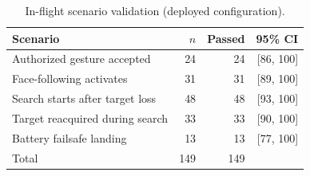 \begin{table}[t]
\caption{In-flight scenario validation (deployed configuration).}
\label{tab:flight}
\centering
\begin{tabular}{lrrr}
\toprule
Scenario & $n$ & Passed & 95\% CI \\
\midrule
Authorized gesture accepted & 24 & 24 & [86, 100] \\
Face-following activates & 31 & 31 & [89, 100] \\
Search starts after target loss & 48 & 48 & [93, 100] \\
Target reacquired during search & 33 & 33 & [90, 100] \\
Battery failsafe landing & 13 & 13 & [77, 100] \\
\midrule
Total & 149 & 149 & \\
\bottomrule
\end{tabular}
\end{table}
